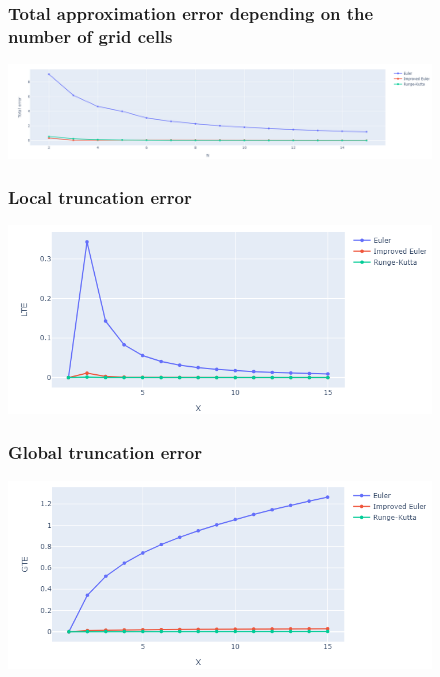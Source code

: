 \documentclass[12pt,letterpaper]{article}
\begin{document}
\begin{figure}[!h]
    \begin{center}
        \subsubsection*{Total approximation error depending on the number of grid cells}
    \end{center}
    \centering
        \includegraphics[width=1\linewidth]{total.png}
\end{figure}

\begin{figure}[!h]
    \begin{center}
        \subsubsection*{Local truncation error}
    \end{center}
    \centering
        \includegraphics[width=0.8\linewidth]{lte.png}
\end{figure}



\begin{figure}[!h]
    \begin{center}
        \subsubsection*{Global truncation error}
    \end{center}
    \centering
        \includegraphics[width=0.8\linewidth]{gte.png}
\end{figure}
\end{document}
